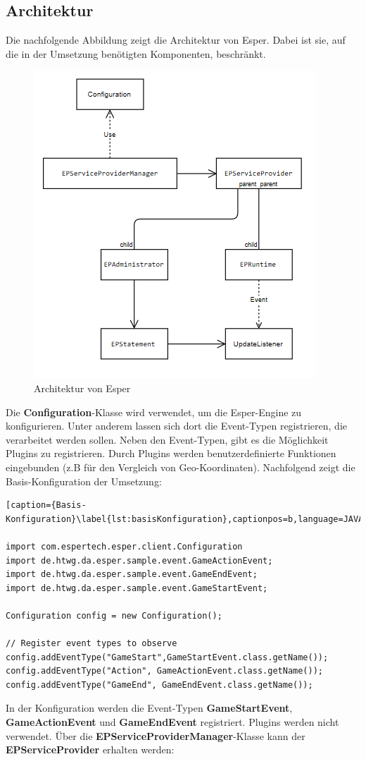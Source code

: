 \subsection{Architektur}
\label{kapitel_architektur}
Die nachfolgende Abbildung zeigt die Architektur von Esper. Dabei ist sie, auf die in der Umsetzung benötigten Komponenten, beschränkt.
\begin{figure}[ht]
	\centering
	\includegraphics{images/Architektur.png}
	\caption{Architektur von Esper}
	\label{architektur}	
\end{figure}
\absatz
Die \textbf{Configuration}-Klasse wird verwendet, um die Esper-Engine zu konfigurieren. Unter anderem lassen sich dort die Event-Typen registrieren, die verarbeitet werden sollen. Neben den Event-Typen, gibt es die Möglichkeit Plugins zu registrieren. 
\absatz
Durch Plugins werden benutzerdefinierte Funktionen eingebunden (z.B für den Vergleich von Geo-Koordinaten).
Nachfolgend zeigt die Basis-Konfiguration der Umsetzung:
\absatz
\begin{lstlisting}[caption={Basis-Konfiguration}\label{lst:basisKonfiguration},captionpos=b,language=JAVA]

import com.espertech.esper.client.Configuration
import de.htwg.da.esper.sample.event.GameActionEvent;
import de.htwg.da.esper.sample.event.GameEndEvent;
import de.htwg.da.esper.sample.event.GameStartEvent;

Configuration config = new Configuration();

// Register event types to observe
config.addEventType("GameStart",GameStartEvent.class.getName());
config.addEventType("Action", GameActionEvent.class.getName());
config.addEventType("GameEnd", GameEndEvent.class.getName());

\end{lstlisting}
In der Konfiguration werden die Event-Typen \textbf{GameStartEvent}, \textbf{GameActionEvent} und \textbf{GameEndEvent} registriert. Plugins werden nicht verwendet.
Über die \textbf{EPServiceProviderManager}-Klasse kann der \textbf{EPServiceProvider} erhalten werden:


